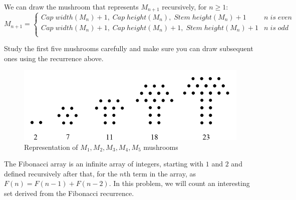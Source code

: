 \documentclass[addpoints]{exam}
\begin{document}
\begin{questions}
We can draw the mushroom that represents $M_{n+1}$ recursively, for $n \geq 1$:
\[ 
    M_{n+1}=
    \begin{cases} 
      
      Cap\;width(M_n) + 1,\;Cap\;height(M_n),\;Stem\;height(M_n) + 1 & n\;is\;even \\
      
      Cap\;width(M_n) + 1,\;Cap\;height(M_n)+1,\;Stem\;height(M_n) + 1 & n\;is\;odd \\
      
   \end{cases}
\]

Study the first five mushrooms carefully and make sure you can draw subsequent ones using the recurrence above.

\begin{figure}[h]
  \centering
  \includegraphics{mushroom_series.png}
  \caption{Representation of $M_1,M_2,M_3,M_4,M_5$ mushrooms}
  \label{fig:mushroom_anatomy}
\end{figure}


\question
    The Fibonacci array is an infinite array of integers, starting with $1$ and $2$ and defined recursively after that, for the $n$th term in the array, as $F(n) = F(n-1) + F(n-2)$. In this problem, we will count an interesting set derived from the Fibonacci recurrence.
    

\end{questions}
\end{document}
